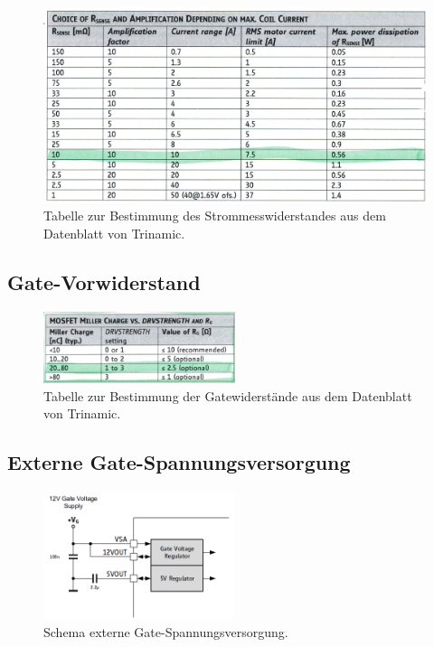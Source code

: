\begin{appendix}
\begin{figure}[h!]
	\centering
	\includegraphics[width=\textwidth]{graphics/Tabelle_Shunts.png}
	\caption{Tabelle zur Bestimmung des Strommesswiderstandes aus dem Datenblatt von Trinamic.}
	\label{fig:Tabelle_Shunts}
\end{figure}

\subsection{Gate-Vorwiderstand}

\begin{figure}[h!]
	\centering
	\includegraphics[width=0.5\textwidth]{graphics/Tabelle_Gatewiderstaende.png}
	\caption{Tabelle zur Bestimmung der Gatewiderstände aus dem Datenblatt von Trinamic.}
	\label{fig:Tabelle_Gatewiderstaende}
\end{figure}

\subsection{Externe Gate-Spannungsversorgung}

\begin{figure}[h!]
	\centering
	\includegraphics[width=0.5\textwidth]{graphics/Schema_Gate_Treiber_Gatespannung}
	\caption{Schema externe Gate-Spannungsversorgung.}
	\label{fig:Schema_Gate_Treiber_Gatespannung}
\end{figure}


\end{appendix}
